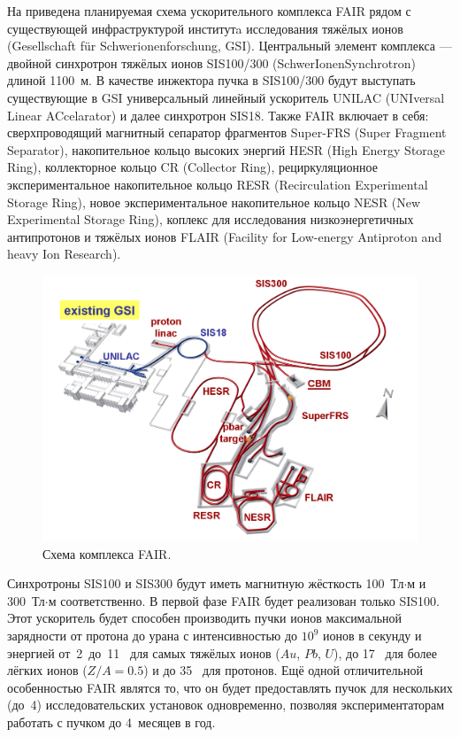 На  приведена планируемая схема ускорительного комплекса FAIR рядом с существующей инфраструктурой институтa исследования тяжёлых ионов (Gesellschaft f\"{u}r Schwerionenforschung, GSI).
Центральный элемент комплекса --- двойной синхротрон тяжёлых ионов SIS100/300 (SchwerIonenSynchrotron) длиной 1100~м. В качестве инжектора пучка в SIS100/300 будут выступать существующие в GSI универсальный линейный ускоритель UNILAC (UNIversal Linear ACcelarator) и далее синхротрон SIS18.
Также FAIR включает в себя:
сверхпроводящий магнитный сепаратор фрагментов Super-FRS (Super Fragment Separator),
накопительное кольцо высоких энергий HESR (High Energy Storage Ring),
коллекторное кольцо CR (Collector Ring),
рециркуляционное экспериментальное накопительное кольцо RESR (Recirculation Experimental Storage Ring), 
новое экспериментальное накопительное кольцо NESR (New Experimental Storage Ring),
коплекс для исследования низкоэнергетичных антипротонов и тяжёлых ионов FLAIR (Facility for Low-energy Antiproton and heavy Ion Research).

\begin{figure}[H]
\includegraphics[width=1.0\textwidth]{pictures/FAIR_structure.png}
\caption{Схема комплекса FAIR.}
\label{fig:FAIRstructure}
\end{figure}

Синхротроны SIS100 и SIS300 будут иметь магнитную жёсткость 100~Тл$\cdot$м и 300~Тл$\cdot$м соответственно. В первой фазе FAIR будет реализован только SIS100. Этот ускоритель будет способен производить пучки ионов максимальной зарядности от протона до урана с интенсивностью до $10^9$ ионов в секунду и энергией от~2~до~11~\GeVperNucl{} для самых тяжёлых ионов ($Au$, $Pb$, $U$), до 17~\GeVperNucl{} для более лёгких ионов ($Z/A=0.5$) и до 35~\GeV{} для протонов.
Ещё одной отличительной особенностью FAIR являтся то, что он будет предоставлять пучок для нескольких (до~4) исследовательских установок одновременно, позволяя экспериментаторам работать с пучком до 4~месяцев в год.


